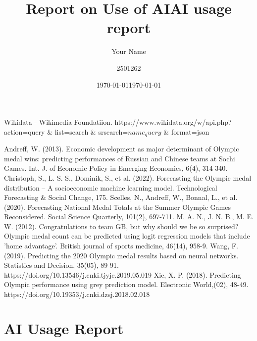 \documentclass{mcmthesis}  %
\begin{document}
\title{Report on Use of AI}
\author{Your Name}
\date{\today}


\newpage


\newenvironment{aitool}[2]{
    \subsection{#1 (#2)}
}{}


\begin{thebibliography}{99}

 Wikidata - Wikimedia Foundatiion. https://www.wikidata.org/w/api.php?action=query \& list=search \& srsearch=${name_query}$ \& format=json

Andreff, W. (2013). Economic development as major determinant of Olympic medal wins: predicting performances of Russian and Chinese teams at Sochi Games. Int. J. of Economic Policy in Emerging Economies, 6(4), 314-340.
Christoph, S., L. S. S., Dominik, S., et al. (2022). Forecasting the Olympic medal distribution – A socioeconomic machine learning model. Technological Forecasting \& Social Change, 175.
Scelles, N., Andreff, W., Bonnal, L., et al. (2020). Forecasting National Medal Totals at the Summer Olympic Games Reconsidered. Social Science Quarterly, 101(2), 697-711.
M. A. N., J. N. B., M. E. W. (2012). Congratulations to team GB, but why should we be so surprised? Olympic medal count can be predicted using logit regression models that include 'home advantage'. British journal of sports medicine, 46(14), 958-9.
Wang, F. (2019). Predicting the 2020 Olympic medal results based on neural networks. Statistics and Decision, 35(05), 89-91. https://doi.org/10.13546/j.cnki.tjyjc.2019.05.019
Xie, X. P. (2018). Predicting Olympic performance using grey prediction model. Electronic World,(02), 48-49. https://doi.org/10.19353/j.cnki.dzsj.2018.02.018
\newpage
\end{thebibliography}


\printbibliography  %

\newenvironment{queryoutput}{
    \begin{enumerate}
}{
    \end{enumerate}
}
\newcommand{\query}[1]{\item \textbf{Query:} #1}
\newcommand{\myoutput}[1]{\item \textbf{Output:} #1}
\title{AI usage report}
\author{2501262}
\date{\today}
\section{AI Usage Report}
\end{document}

